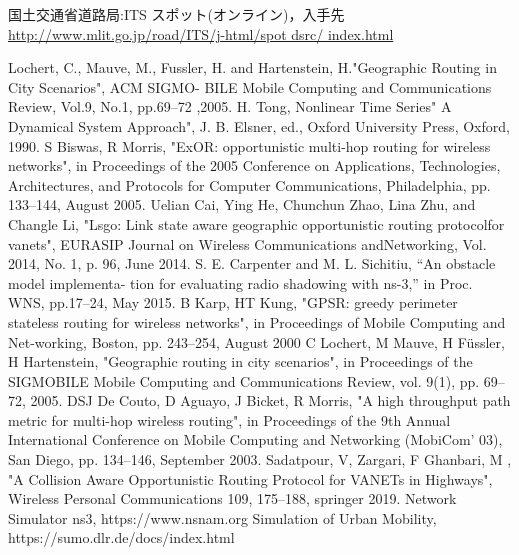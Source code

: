 \documentclass[technicalreport]{ieicej}
\begin{document}
\begin{thebibliography}{99}

	国土交通省道路局:ITS スポット(オンライン)，入手先
\url{http://www.mlit.go.jp/road/ITS/j-html/spot dsrc/ index.html}


Lochert, C., Mauve, M., Fussler, H. and Hartenstein, H."Geographic Routing in City Scenarios", ACM SIGMO- BILE Mobile Computing and Communications Review, Vol.9, No.1, pp.69–72 ,2005.
	H. Tong, Nonlinear Time Series" A Dynamical System Approach", J. B. Elsner, ed., Oxford University Press, Oxford, 1990.
	S Biswas, R Morris, "ExOR: opportunistic multi-hop routing for wireless networks", in Proceedings of the 2005 Conference on Applications, Technologies, Architectures, and Protocols for Computer Communications, Philadelphia, pp. 133–144, August 2005. 
 	Uelian Cai, Ying He, Chunchun Zhao, Lina Zhu, and Changle Li, "Lsgo: Link state aware geographic opportunistic routing protocolfor vanets", EURASIP Journal on Wireless Communications andNetworking, Vol. 2014, No. 1, p. 96, June 2014.
 	S. E. Carpenter and M. L. Sichitiu, “An obstacle model implementa- tion for evaluating radio shadowing with ns-3,” in Proc. WNS, pp.17–24, May 2015.
 	B Karp, HT Kung, "GPSR: greedy perimeter stateless routing for wireless networks", in Proceedings of Mobile Computing and Net-working, Boston, pp. 243–254, August 2000
	C Lochert, M Mauve, H Füssler, H Hartenstein, "Geographic routing in city scenarios", in Proceedings of the SIGMOBILE Mobile Computing and Communications Review, vol. 9(1), pp. 69–72, 2005.
 DSJ De Couto, D Aguayo, J Bicket, R Morris, "A high throughput path metric for multi-hop wireless routing", in Proceedings of the 9th Annual International Conference on Mobile Computing and Networking (MobiCom’ 03), San Diego, pp. 134–146, September 2003.
Sadatpour, V, Zargari, F Ghanbari, M , "A Collision Aware Opportunistic Routing Protocol for VANETs in Highways",  Wireless Personal Communications 109, 175–188, springer 2019.
 Network Simulator ns3, https://www.nsnam.org
 Simulation of Urban Mobility, https://sumo.dlr.de/docs/index.html 
\end{thebibliography}
\end{document}
